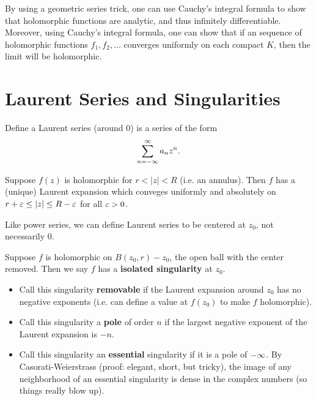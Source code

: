 By using a geometric series trick, one can use Cauchy's integral formula to show that holomorphic functions are analytic, and thus infinitely differentiable. Moreover, using Cauchy's integral formula, one can show that if an sequence of holomorphic functions $f_1, f_2, \dots$ converges uniformly on each compact $K$, then the limit will be holomorphic.

\section{Laurent Series and Singularities}
Define a Laurent series (around 0) is a series of the form
\[
    \sum_{n = -\infty}^\infty a_nz^n.
\]
\begin{thm}
    Suppose $f(z)$ is holomorphic for $r < |z| < R$ (i.e. an annulus). Then $f$ has a (unique) Laurent expansion which conveges uniformly and absolutely on $r + \varepsilon \le |z| \le R - \varepsilon$ for all $\varepsilon > 0$.
\end{thm}
Like power series, we can define Laurent series to be centered at $z_0$, not necessarily 0.

Suppose $f$ is holomorphic on $B(z_0,r) - z_0$, the open ball with the center removed. Then we say $f$ has a \textbf{isolated singularity} at $z_0$. 
\begin{itemize}
    \item Call this singularity \textbf{removable} if the Laurent expansion around $z_0$ has no negative exponents (i.e. can define a value at $f(z_0)$ to make $f$ holomorphic).
    \item Call this singularity a \textbf{pole} of order $n$ if the largest negative exponent of the Laurent expansion is $-n$.
    \item Call this singularity an \textbf{essential} singularity if it is a pole of $-\infty$. By Casorati-Weierstrass (proof: elegant, short, but tricky), the image of any neighborhood of an essential singularity is dense in the complex numbers (so things really blow up).
\end{itemize}

